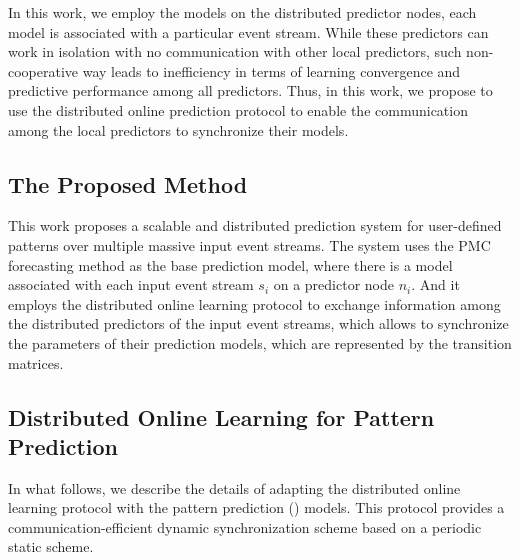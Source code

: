   
  \par In this work, we employ the \pmcmr models on the distributed predictor nodes, each model is associated with a particular event stream. While these predictors can work in isolation with no communication with other local predictors, such non-cooperative way leads to inefficiency in terms of learning convergence and predictive performance among all predictors. Thus, in this work, we propose to use the distributed online prediction protocol \cite{kamp2014communication} to enable the communication among the local predictors to synchronize their models.     
%

\subsection{The Proposed Method}
\label{sec:proposed_approach}

\par This work proposes a scalable and distributed prediction system for user-defined patterns over multiple massive input event streams. The system  uses the PMC forecasting method \cite{alevizos2017event} as the base prediction model, where there is a \pmcmr model associated with each input event stream $s_i$ on a predictor node $n_i$. And it employs the distributed online learning protocol \cite{kamp2014communication} to exchange information among the distributed predictors of the input event streams, which allows to synchronize the parameters of their prediction models, which are represented by the transition matrices.

%

\subsection*{Distributed Online Learning for Pattern Prediction}

\par In what follows, we describe the details of adapting the distributed online learning protocol \cite{kamp2014communication} with the pattern prediction (\pmcmr) models. This protocol provides a communication-efficient dynamic synchronization scheme based on a periodic static scheme.



